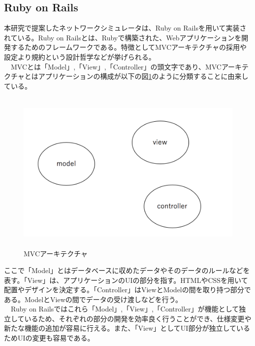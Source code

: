 \subsection{Ruby on Rails}
\label{tag:rails}
本研究で提案したネットワークシミュレータは、Ruby on Railsを用いて実装されている。Ruby on Railsとは、Rubyで構築された、Webアプリケーションを開発するためのフレームワークである。特徴としてMVCアーキテクチャの採用や設定より規約という設計哲学などが挙げられる。\\
　MVCとは「Model」,「View」,「Controller」の頭文字であり、MVCアーキテクチャとはアプリケーションの構成が以下の図\ref{fig:MVC}のように分類することに由来している。


\begin{figure}[htbp]
  \begin{center}
    \includegraphics[clip,width=12.0cm,height=8.0cm]{img/mvc.png}
    \caption{MVCアーキテクチャ}
    \label{fig:MVC}
  \end{center}
\end{figure}

ここで「Model」とはデータベースに収めたデータやそのデータのルールなどを表す。「View」は、アプリケーションのUIの部分を指す。HTMLやCSSを用いて配置やデザインを決定する。「Controller」はViewとModelの間を取り持つ部分である。ModelとViewの間でデータの受け渡しなどを行う。\\
　Ruby on Railsではこれら「Model」,「View」,「Controller」が機能として独立しているため、それぞれの部分の開発を効率良く行うことができ、仕様変更や新たな機能の追加が容易に行える。また、「View」としてUI部分が独立しているためUIの変更も容易である。
